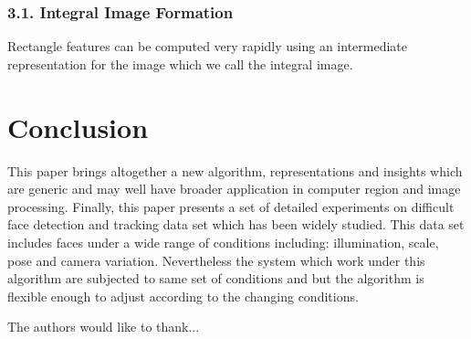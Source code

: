 \documentclass[journal]{IEEEtran}
\begin{document}
\subsubsection{3.1. Integral Image Formation}
Rectangle features can be computed very rapidly using an intermediate representation for the image which we call the integral image.

\section{Conclusion}
This paper brings altogether a new algorithm, representations and insights which are generic and may well have broader application in computer region and image processing. Finally, this paper presents a set of detailed experiments on difficult face detection and tracking data set which has been widely studied. This data set includes faces under a wide range of conditions including: illumination, scale, pose and camera variation. Nevertheless the system which work under this algorithm are subjected to same set of conditions and but the algorithm is flexible enough to adjust according to the changing conditions.



The authors would like to thank...

\ifCLASSOPTIONcaptionsoff
  \newpage
\fi



\begin{IEEEbiography}{}

\end{IEEEbiography}
\end{document}
